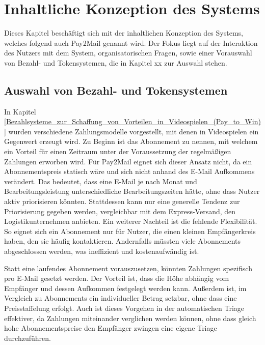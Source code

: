 
\chapter{Inhaltliche Konzeption des Systems}
\label{Inhaltliche_Konzeption_des_Systems}

Dieses Kapitel beschäftigt sich mit der inhaltlichen Konzeption des Systems, welches folgend auch Pay2Mail genannt wird. Der Fokus liegt auf der Interaktion des Nutzers mit dem System, organisatorischen Fragen, sowie einer Vorauswahl von Bezahl- und Tokensystemen, die in Kapitel xx zur Auswahl stehen.

\section{Auswahl von Bezahl- und Tokensystemen}
\label{Auswahl_von_Bezahl-_und_Tokensystemen}
In Kapitel \ref{Bezahlsysteme_zur_Schaffung_von_Vorteilen_in_Videospielen_(Pay_to_Win)} wurden verschiedene Zahlungsmodelle vorgestellt, mit denen in Videospielen ein Gegenwert erzeugt wird. Zu Beginn ist das Abonnement zu nennen, mit welchem ein Vorteil für einen Zeitraum unter der Voraussetzung der regelmäßigen Zahlungen erworben wird. Für Pay2Mail eignet sich dieser Ansatz nicht, da ein Abonnementspreis statisch wäre und sich nicht anhand des E-Mail Aufkommens verändert. Das bedeutet, dass eine E-Mail je nach Monat und Bearbeitungsleistung unterschiedliche Bearbeitungszeiten hätte, ohne dass Nutzer aktiv priorisieren könnten. Stattdessen kann nur eine generelle Tendenz zur Priorisierung gegeben werden, vergleichbar mit dem Express-Versand, den Logistikunternehmen anbieten. Ein weiterer Nachteil ist die fehlende Flexibilität. So eignet sich ein Abonnement nur für Nutzer, die einen kleinen Empfängerkreis haben, den sie häufig kontaktieren. Andernfalls müssten viele Abonnements abgeschlossen werden, was ineffizient und kostenaufwändig ist.

Statt eine laufendes Abonnement vorauszusetzen, könnten Zahlungen spezifisch pro E-Mail gesetzt werden. Der Vorteil ist, dass die Höhe abhängig vom Empfänger und dessen Aufkommen festgelegt werden kann. Außerdem ist, im Vergleich zu Abonnements ein individueller Betrag setzbar, ohne dass eine Preisstaffelung erfolgt. Auch ist dieses Vorgehen in der automatischen Triage effektiver, da Zahlungen miteinander verglichen werden können, ohne dass gleich hohe Abonnementspreise den Empfänger zwingen eine eigene Triage durchzuführen. 

